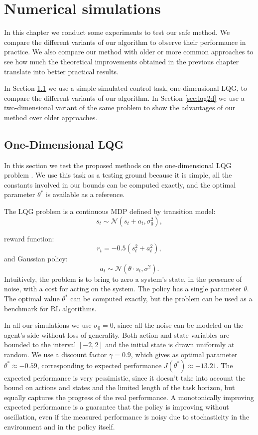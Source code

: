 \chapter{Numerical simulations}\label{sec:simul}

In this chapter we conduct some experiments to test our safe method. We compare the different variants of our algorithm to observe their performance in practice. We also compare our method with older or more common approaches to see how much the theoretical improvements obtained in the previous chapter translate into better practical results.

In Section \ref{sec:lqg1d} we use a simple simulated control task, one-dimensional \ac{LQG}, to compare the different variants of our algorithm.
In Section \ref{sec:lqg2d} we use a two-dimensional variant of the same problem to show the advantages of our method over older approaches. 

\section{One-Dimensional LQG}\label{sec:lqg1d}
In this section we test the proposed methods on the one-dimensional \ac{LQG} problem \cite{4867}. We use this task as a testing ground because it is simple, all the constants involved in our bounds can be computed exactly, and the optimal parameter $\theta^*$ is available as a reference.

The LQG problem is a continuous \ac{MDP} defined by transition model:
\[
	s_t \sim \mathcal{N}(s_t+a_t,\sigma_0^2),
\] 

reward function:
\[
	r_t=-0.5(s_t^2+a_t^2),
\]
and Gaussian policy:
\[
	a_t \sim \mathcal{N}(\theta\cdot s_t,\sigma^2).
\]
Intuitively, the problem is to bring to zero a system's state, in the presence of noise, with a cost for acting on the system.
The policy has a single parameter $\theta$. The optimal value $\theta^*$ can be computed exactly, but the problem can be used as a benchmark for \ac{RL} algorithms.

In all our simulations we use $\sigma_0 = 0$, since all the noise can be modeled on the agent's side without loss of generality. Both action and state variables are bounded to the interval $[-2,2]$ and the initial state is drawn uniformly at random.  
We use a discount factor $\gamma=0.9$, which gives as optimal parameter $\theta^* \approx -0.59$, corresponding to expected performance $J(\theta^*) \approx -13.21$. The expected performance is very pessimistic, since it doesn't take into account the bound on actions and states and the limited length of the task horizon, but equally captures the progress of the real performance. A monotonically improving expected performance is a guarantee that the policy is improving without oscillation, even if the measured performance is noisy due to stochasticity in the environment and in the policy itself.

